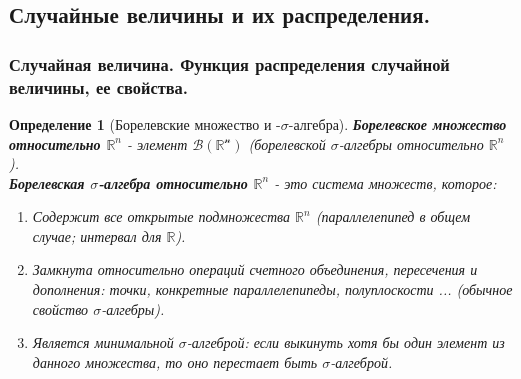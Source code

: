\documentclass[14pt]{extarticle}
\theoremstyle{breakstyle}
\newtheorem{definition}{Определение}[subsection]
\begin{document}
\subsection{Случайные величины и их распределения.}

\subsubsection{Случайная величина. Функция распределения случайной величины, ее свойства.}
\begin{definition}[Борелевские множество и -$\sigma$-алгебра]

\textbf{Борелевское множество относительно $\mathbb{R}^{n}$} - элемент $\mathscr{B(\mathbb{R}^{n})}$ (борелевской $\sigma$-алгебры относительно $\mathbb{R}^{n}$).\\

\textbf{Борелевская $\sigma$-алгебра относительно $\mathbb{R}^{n}$} - это система множеств, которое:
\begin{enumerate}
    \item Содержит все открытые подмножества $\mathbb{R}^{n}$ (параллелепипед в общем случае; интервал для $\mathbb{R}$).
    \item Замкнута относительно операций счетного объединения, пересечения и дополнения: точки, конкретные параллелепипеды, полуплоскости ... (обычное свойство $\sigma$-алгебры). 
    \item Является минимальной $\sigma$-алгеброй: если выкинуть хотя бы один элемент из данного множества, то оно перестает быть $\sigma$-алгеброй.
\end{enumerate}

\end{definition}
\end{document}
